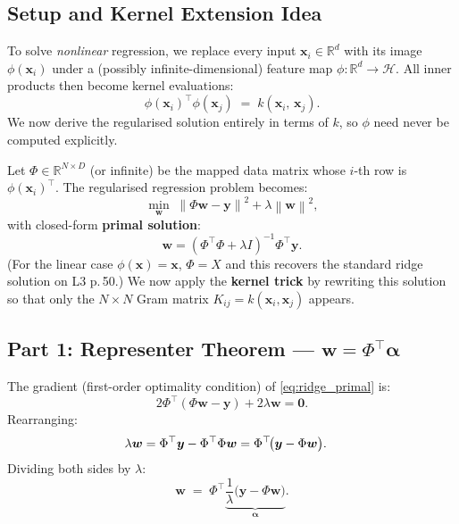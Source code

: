 \documentclass[12pt,a4paper]{article}
\newcommand{\R}{\mathbb{R}}
\newcommand{\bx}{\bm{x}}
\newcommand{\bw}{\bm{w}}
\newcommand{\by}{\bm{y}}
\newcommand{\ba}{\bm{\alpha}}
\newcommand{\norm}[1]{\left\lVert #1 \right\rVert}
\begin{document}
\subsection*{Setup and Kernel Extension Idea}

To solve \emph{nonlinear} regression, we replace every input $\bx_i \in \R^d$
with its image $\phi(\bx_i)$ under a (possibly infinite-dimensional) feature
map $\phi: \R^d \to \mathcal{H}$.  All inner products then become kernel
evaluations:
\[
  \phi(\bx_i)^\top \phi(\bx_j) \;=\; k(\bx_i,\, \bx_j).
\]
We now derive the regularised solution entirely in terms of $k$, so $\phi$ need
never be computed explicitly.

Let $\Phi \in \R^{N\times D}$ (or infinite) be the mapped data matrix whose
$i$-th row is $\phi(\bx_i)^\top$.  The regularised regression problem becomes:
\begin{equation}
  \min_{\bw}\;
  \norm{\Phi\bw - \by}^2 + \lambda\norm{\bw}^2,
  \label{eq:ridge_primal}
\end{equation}
with closed-form \textbf{primal solution}:
\begin{equation}
  \bw = (\Phi^\top \Phi + \lambda I)^{-1} \Phi^\top \by.
  \label{eq:primal_sol}
\end{equation}
(For the linear case $\phi(\bx)=\bx$, $\Phi = X$ and this recovers the
standard ridge solution on L3 p.\,50.)
We now apply the \textbf{kernel trick} by rewriting this solution so that
only the $N\times N$ Gram matrix $K_{ij}=k(\bx_i,\bx_j)$ appears.

\subsection{Part 1: Representer Theorem --- \texorpdfstring{$\bw = \Phi^\top \ba$}{w = Phi' alpha}}

The gradient (first-order optimality condition) of \eqref{eq:ridge_primal} is:
\begin{equation}
  2\Phi^\top(\Phi\bw - \by) + 2\lambda\bw = \bm{0}.
\end{equation}
Rearranging:
\begin{align}
  \lambda\bw
  &= \Phi^\top\by - \Phi^\top\Phi\bw
   = \Phi^\top\!\bigl(\by - \Phi\bw\bigr). \notag
\end{align}
Dividing both sides by $\lambda$:
\begin{equation}
  \bw \;=\; \Phi^\top\underbrace{\frac{1}{\lambda}\bigl(\by - \Phi\bw\bigr)}_{\displaystyle\ba}.
  \label{eq:representer}
\end{equation}
\end{document}
